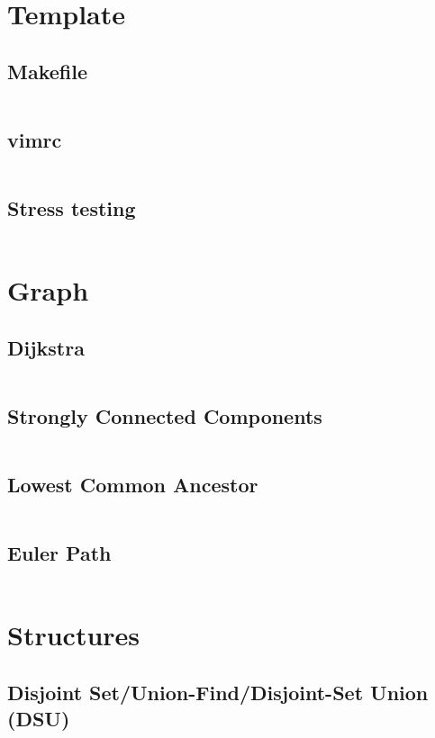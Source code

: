 \section{Template}
  \subsection{Makefile}
    \inputminted{bash}{library/template/compile.sh}
  \subsection{vimrc}
    \inputminted{vim}{library/template/.vimrc}
  \subsection{Stress testing}
    \inputminted{bash}{library/template/stress.sh}

\clearpage

\section{Graph}
  \subsection{Dijkstra}
    \inputminted{cpp}{library/graphs/dijkstra.cpp}
  \subsection{Strongly Connected Components}
    \inputminted{cpp}{library/graphs/scc.cpp}
  \subsection{Lowest Common Ancestor}
    \inputminted{cpp}{library/graphs/lca.cpp}
  \subsection{Euler Path}
    \inputminted{cpp}{library/graphs/euler_path.cpp}

\section{Structures}
  \subsection{Disjoint Set/Union-Find/Disjoint-Set Union (DSU)}
    \inputminted{cpp}{library/structures/dsu.hpp}
